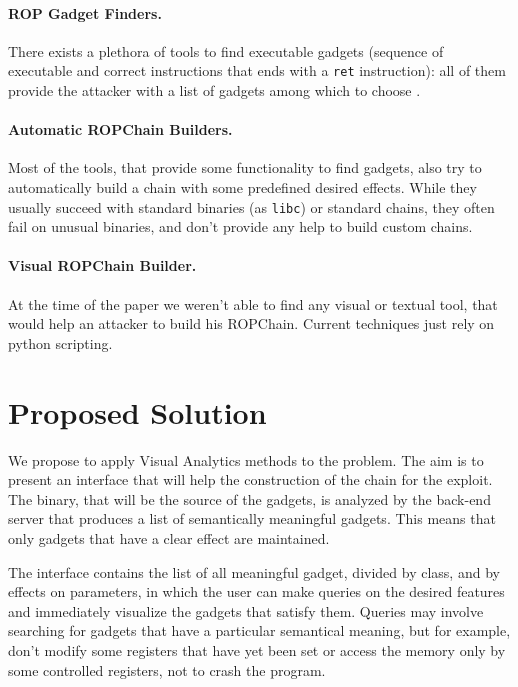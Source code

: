 \documentclass[twocolumn, 11pt]{article}
\begin{document}
\paragraph{ROP Gadget Finders.} There exists a plethora of tools to find executable gadgets (sequence of executable and correct instructions that ends with a {\tt ret} instruction): all of them provide the attacker with a list of gadgets among which to choose \cite{ropper} \cite{ROPGadget}.

\paragraph{Automatic ROPChain Builders.} Most of the tools, that provide some functionality to find gadgets, also try to automatically build a chain with some predefined desired effects. While they usually succeed with standard binaries (as {\tt libc}) or standard chains, they often fail on unusual binaries, and don't provide any help to build custom chains.

\paragraph{Visual ROPChain Builder.} At the time of the paper we weren't able to find any visual or textual tool, that would help an attacker to build his ROPChain. Current techniques just rely on python scripting.

\section{Proposed Solution}

We propose to apply Visual Analytics methods to the problem. The aim is to present an interface that will help the construction of the chain for the exploit.
The binary, that will be the source of the gadgets, is analyzed by the back-end server that produces a list of semantically meaningful gadgets. This means that only gadgets that have a clear effect are maintained.

The interface contains the list of all meaningful gadget, divided by class, and by effects on parameters, in which the user can make queries on the desired features and immediately visualize the gadgets that satisfy them.
Queries may involve searching for gadgets that have a particular semantical meaning, but for example, don't modify some registers that have yet been set or access the memory only by some controlled registers, not to crash the program.
\end{document}
